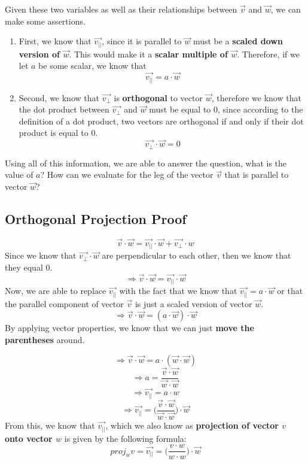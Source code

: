 \documentclass{report}
\begin{document}
\begin{sloppypar}
Given these two variables as well as their relationships
between $ \vec{v}$ and $ \vec{w}$, we can make
some assertions.
\begin{enumerate}
  \item First, we know that $ \vec{v_{||}}$, since
        it is parallel to $ \vec{w}$ must be a
        \textbf{scaled down version of $ \vec{w}$}.
        This would make it a \textbf{scalar multiple
        of $ \vec{w}$}. Therefore, if we let $ a $ be
        some scalar, we know that
        \[ \overrightarrow{v_{||}} = a \cdot \vec{w}\]
  \item Second, we know that $ \vec{v_{\perp}}$
        is \textbf{orthogonal} to vector $\vec{w}$,
        therefore we know that the dot product
        between $ \vec{v_{\perp}}$ and $ \vec{w}$ must
        be equal to 0, since according to the definition
        of a dot product, two vectors are orthogonal
        if and only if their dot product is equal to 0.
        \[ \overrightarrow{v_{\perp}} \cdot \vec{w} = 0 \]
\end{enumerate}
Using all of this information, we are able to answer
the question, what is the value of $ a$? How can we
evaluate for the leg of the vector $ \vec{v}$ that is
parallel to vector $ \vec{w}$?

\subsection{Orthogonal Projection Proof}
\[ \vec{v} \cdot \vec{w} = \overrightarrow{v_{||}} \cdot
  \vec{w} + \overrightarrow{v_{\perp}} \cdot{w}\]
Since we know that $ \overrightarrow{v_{\perp}}
\cdot \vec{w} $ are perpendicular to each other, then
we know that they equal 0.
\[ \Rightarrow \vec{v} \cdot \vec{w} = \overrightarrow{v_{||}} \cdot
  \vec{w}  \]
Now, we are able to replace $ \overrightarrow{v_{||}}$
with the fact that we know that  $ \overrightarrow{v_{||}} =
a \cdot \vec{w}$ or that the parallel component of
vector $ \vec{v}$ is just a scaled version of
vector $ \vec{w}$.
\[ \Rightarrow \vec{v} \cdot \vec{w} =
(a \cdot \vec{w}) \cdot \vec{w}\]
By applying vector properties, we know that we can just
\textbf{move the parentheses} around.

\[ \Rightarrow \vec{v} \cdot \vec{w} =
  a \cdot (\vec{w} \cdot \vec{w})\]
\[ \Rightarrow a = \frac{\vec{v} \cdot \vec{w}}
  {\vec{w} \cdot \vec{w}}\]
\[ \Rightarrow \overrightarrow{v_{||}} = a
  \cdot w \]
\[ \Rightarrow \overrightarrow{v_{||}} =
\Biggr( \frac{\vec{v} \cdot \vec{w}}
{\vec{w} \cdot \vec{w}} \Biggr) \cdot
\vec{w} \]
From this, we know that $ \vec{v_{||}}$, which we
also know as \textbf{projection of vector $ v$ onto
  vector $ w $} is given by the following formula:
\[ proj_{w}v = \overrightarrow{v_{||}} =
  \Biggr(\frac{v \cdot w}{w \cdot w}\Biggr) \cdot \vec{w} \]

\end{sloppypar}
\end{document}
